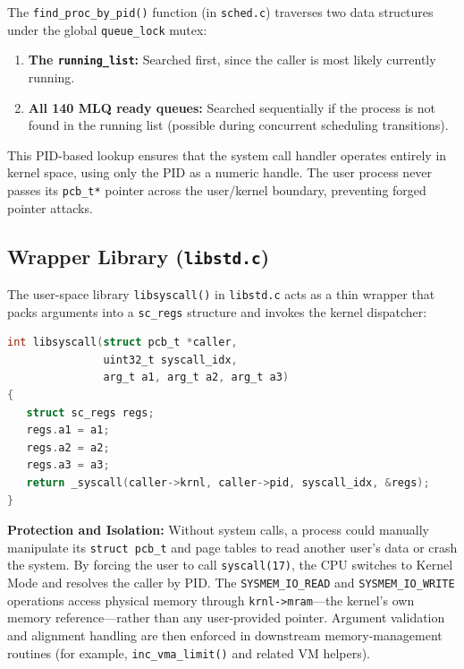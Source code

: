 The \texttt{find\_proc\_by\_pid()} function (in \texttt{sched.c}) traverses two data structures under the global \texttt{queue\_lock} mutex:
\begin{enumerate}
    \item \textbf{The \texttt{running\_list}:} Searched first, since the caller is most likely currently running.
    \item \textbf{All 140 MLQ ready queues:} Searched sequentially if the process is not found in the running list (possible during concurrent scheduling transitions).
\end{enumerate}
This PID-based lookup ensures that the system call handler operates entirely in kernel space, using only the PID as a numeric handle. The user process never passes its \texttt{pcb\_t*} pointer across the user/kernel boundary, preventing forged pointer attacks.

\subsection{Wrapper Library (\texttt{libstd.c})}
The user-space library \texttt{libsyscall()} in \texttt{libstd.c} acts as a thin wrapper that packs arguments into a \texttt{sc\_regs} structure and invokes the kernel dispatcher:
\begin{lstlisting}[language=C, caption=User-space syscall wrapper (\texttt{libstd.c})]
int libsyscall(struct pcb_t *caller,
               uint32_t syscall_idx,
               arg_t a1, arg_t a2, arg_t a3)
{
   struct sc_regs regs;
   regs.a1 = a1;
   regs.a2 = a2;
   regs.a3 = a3;
   return _syscall(caller->krnl, caller->pid, syscall_idx, &regs);
}
\end{lstlisting}

\noindent\textbf{Protection and Isolation:} Without system calls, a process could manually manipulate its \texttt{struct pcb\_t} and page tables to read another user's data or crash the system. By forcing the user to call \texttt{syscall(17)}, the CPU switches to Kernel Mode and resolves the caller by PID. The \texttt{SYSMEM\_IO\_READ} and \texttt{SYSMEM\_IO\_WRITE} operations access physical memory through \texttt{krnl->mram}---the kernel's own memory reference---rather than any user-provided pointer. Argument validation and alignment handling are then enforced in downstream memory-management routines (for example, \texttt{inc\_vma\_limit()} and related VM helpers).